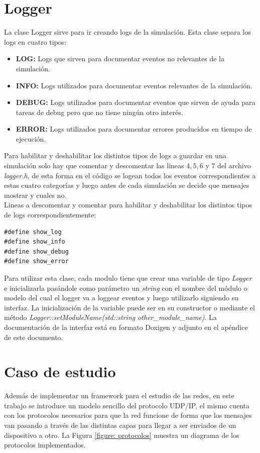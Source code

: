 \documentclass[10pt,a4paper]{article}
\begin{document}
\section{Logger}

La clase Logger sirve para ir creando logs de la simulación. Esta clase separa los logs en cuatro tipos:

\begin{itemize}
\item \textbf{LOG:} Logs que sirven para documentar eventos no relevantes de la simulación.
\item \textbf{INFO:} Logs utilizados para documentar eventos relevantes de la simulación.
\item \textbf{DEBUG:} Logs utilizados para documentar eventos que sirven de ayuda para tareas de debug pero que no tiene ningún otro interés.
\item \textbf{ERROR:} Logs utilizados para documentar errores producidos en tiempo de ejecución.
\end{itemize}

Para habilitar y deshabilitar los distintos tipos de logs a guardar en una simulación solo hay que comentar y descomentar las lineas $4,5,6$ y $7$ del archivo \textit{logger.h}, de esta forma en el código se logean todos los eventos correspondientes a estas cuatro categorías y luego antes de cada simulación se decide que mensajes mostrar y cuales no. \\

Lineas a descomentar y comentar para habilitar y deshabilitar los distintos tipos de logs correspondientemente:
\begin{lstlisting}
#define show_log
#define show_info
#define show_debug
#define show_error
\end{lstlisting}

Para utilizar esta clase, cada modulo tiene que crear una variable de tipo \textit{Logger} e inicializarla pasándole como parámetro un \textit{string} con el nombre del módulo o modelo del cual el logger va a loggear eventos y luego utilizarlo siguiendo su interfaz. La inicialización de la variable puede ser en su constructor o mediante el método \textit{Logger::setModuleName(std::string other\_module\_name)}. La documentación de la interfaz está en formato Doxigen y adjunto en el apéndice de este documento. \\

\section{Caso de estudio}
	Además de implementar un framework para el estudio de las redes, en este trabajo se introduce un modelo sencillo del protocolo UDP/IP, el mismo cuenta con los protocolos necesarios para que la red funcione de forma que los mensajes van pasando a través de las distintas capas para llegar a ser enviados de un dispositivo a otro. La Figura \ref{figure: protocolos} muestra un diagrama de los protocolos implementados. \\
\end{document}
